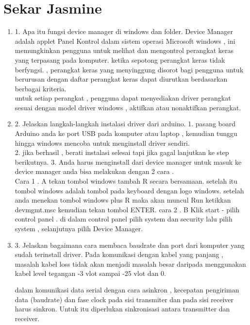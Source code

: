 \section {Sekar Jasmine}
\begin{enumerate}

\item 1. Apa itu fungsi device manager di windows dan folder.
Device Manager adalah applet Panel Kontrol dalam sistem operasi Microsoft windows , ini  memungkinkan pengguna untuk melihat dan mengontrol perangkat keras yang terpasang pada komputer. ketika sepotong perangkat keras tidak berfyngsi. , perangkat keras yang menyinggung disorot bagi pengguna untuk berurusan dengan daftar perangkat keras dapat diurutkan berdasarkan berbagai kriteria.\\

untuk setiap perangkat , pengguna dapat menyediakan driver perangkat sesuai dengan model driver windows , aktifkan atau nonaktifkan perangkat.\\

\item 2. Jelaskan langkah-langkah instalasi driver dari arduino.
1. pasang board Arduino anda ke port USB pada komputer atau laptop , kemudian tunggu hingga windows mencoba untuk menginstall driver sendiri.\\
2. jika berhasil , berati instalasi selesai tapi jika gagal lanjutkan ke step berikutnya.
3. Anda harus menginstall dari device manager untuk masuk ke device manager anda bisa melakukan dengan 2 cara .\\
Cara 1 . A tekan tombol windows tambah R secara bersamaan. setelah itu tombol windows adalah tombol pada keyboard dengan logo windows. setelah anda menekan tombol windows plus R maka akan muncul Run ketikkan devmgmt.msc kemudian tekan tombol ENTER.
cara 2 . B Klik start - pilih control panel . di dalam control panel pilih system dan security lalu pilih system , selanjutnya pilih Device Manager.\\

\item 3. Jelaskan bagaimana cara membaca baudrate dan port dari komputer yang sudah terinstall driver.
Pada komunikasi dengan kabel yang panjang , masalah kabel loss tidak akan menjadi masalah besar daripada menggunakan kabel level tegangan -3 vlot sampai -25 vlot dan 0.

dalam komunikasi data serial dengan cara asinkron , kecepatan pengiriman data (baudrate) dan fase clock pada sisi transmiter dan pada sisi receiver harus sinkron. Untuk itu diperlukan sinkronisasi antara transmitter dan receiver.\\


\end{enumerate}
